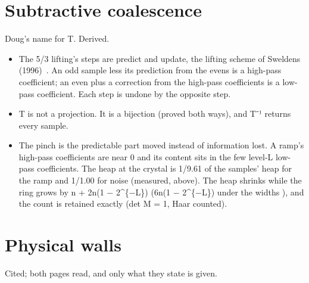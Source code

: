 \section{\texorpdfstring{Subtractive coalescence}{Subtractive coalescence}}

Doug's name for T. Derived.

\begin{itemize}
\item The 5/3 lifting's steps are predict and update, the lifting scheme of Sweldens (1996)~\cite{src:Sweldens-1996}. An odd sample less its prediction from the evens is a high-pass coefficient; an even plus a correction from the high-pass coefficients is a low-pass coefficient. Each step is undone by the opposite step.
\item T is not a projection. It is a bijection (proved both ways), and T⁻¹ returns every sample.
\item The pinch is the predictable part moved instead of information lost. A ramp's high-pass coefficients are near 0 and its content sits in the few level-L low-pass coefficients. The heap at the crystal is 1/9.61 of the samples' heap for the ramp and 1/1.00 for noise (measured, above). The heap shrinks while the ring grows by n + 2n(1 − 2\textasciicircum{}\{−L\}) (6n(1 − 2\textasciicircum{}\{−L\}) under the widths ), and the count is retained exactly (det M = 1, Haar counted).
\end{itemize}

\section{\texorpdfstring{Physical walls}{Physical walls}}

Cited; both pages read, and only what they state is given.

